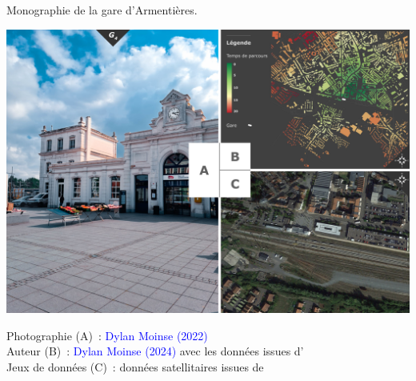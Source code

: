 \begin{refsegment}
        \begin{carte}[h!]\vspace*{4pt}
        \caption{Monographie de la gare d'Armentières.}
        \label{fig-chap3:monographie-armentieres}
        \centerline{\includegraphics[height=.35\pageheight]{src/Figures/Chap-3/FR_Gare_Armentieres.jpg}}
        \vspace{5pt}
        \begin{flushright}\scriptsize{
        Photographie (A)~: \textcolor{blue}{Dylan Moinse (2022)}
        \\
        Auteur (B)~: \textcolor{blue}{Dylan Moinse (2024)} avec les données issues d'\textcolor{blue}{\textcite{openstreetmap_openstreetmap_2023}}
        \\
      Jeux de données (C)~: données satellitaires issues de \textcolor{blue}{\textcite{google_earth_google_2023}}
      }\end{flushright}
      \end{carte}


\end{refsegment}

